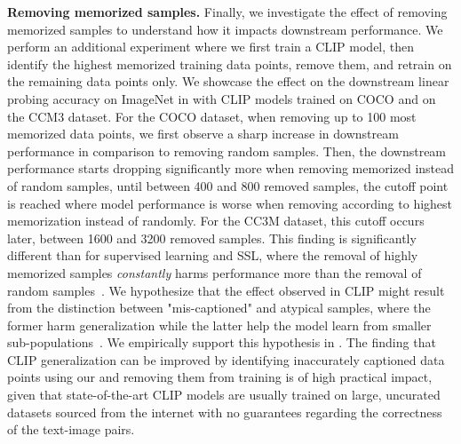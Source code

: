 \textbf{Removing memorized samples.}
Finally, we investigate the effect of removing memorized samples to understand how it impacts downstream performance. We
perform an additional experiment where we first train a CLIP model, then identify the highest memorized training data points, remove them, and retrain on the remaining data points only. 
We showcase the effect on the downstream linear probing accuracy on ImageNet in  with CLIP models trained on COCO and on the CCM3 dataset. For the COCO dataset,
when removing up to 100 most memorized data points, we first observe a sharp increase in downstream performance in comparison to removing random samples. 
Then, the downstream performance starts dropping significantly more when removing memorized instead of random samples, until between 400 and 800 removed samples, the cutoff point is reached where model performance is worse when removing according to highest memorization instead of randomly.
For the CC3M dataset, this cutoff occurs later, between 1600 and 3200 removed samples.
This finding is significantly different than for supervised learning and SSL, where the removal of highly memorized samples \textit{constantly} harms performance more than the removal of random samples~\citep{feldman2020does,wang2024memorization}.
We hypothesize that the effect observed in CLIP might result from the distinction between "mis-captioned" and atypical samples, where the former harm generalization while the latter help the model learn from smaller sub-populations~\citep{feldman2020does}. We empirically support this hypothesis in .
The finding that CLIP generalization can be improved by identifying inaccurately captioned data points using our \ours and removing them from training is of high practical impact, given that state-of-the-art CLIP models are usually trained on large, uncurated datasets sourced from the internet with no guarantees regarding the correctness of the text-image pairs.

